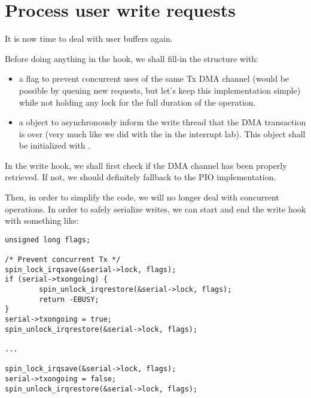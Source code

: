 \section{Process user write requests}

It is now time to deal with user buffers again.

Before doing anything in the  hook, we shall fill-in the
 structure with:
\begin{itemize}
\item a  flag to prevent concurrent uses of the same
  Tx DMA channel (would be possible by queuing new requests, but let's keep this
  implementation simple) while not holding any lock for the full duration of
  the operation.
\item a  object to asynchronously inform the
  write thread that the DMA transaction is over (very much like we did with the
   in the interrupt lab). This object shall be initialized with
  .
\end{itemize}

\if{}
In the write hook, we shall first check if the DMA channel has been
properly retrieved. If not, we should definitely fallback to the PIO
implementation.

Then, in order to simplify the code, we will no longer deal with
concurrent operations. In order to safely serialize writes, we can start
and end the write hook with something like:

\begin{verbatim}
unsigned long flags;

/* Prevent concurrent Tx */
spin_lock_irqsave(&serial->lock, flags);
if (serial->txongoing) {
        spin_unlock_irqrestore(&serial->lock, flags);
        return -EBUSY;
}
serial->txongoing = true;
spin_unlock_irqrestore(&serial->lock, flags);

...

spin_lock_irqsave(&serial->lock, flags);
serial->txongoing = false;
spin_unlock_irqrestore(&serial->lock, flags);
\end{verbatim}

